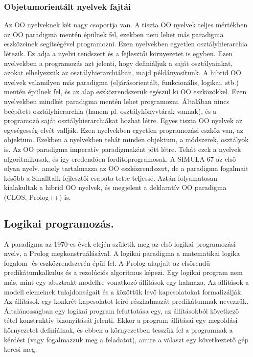 \subsubsection{Objetumorientált nyelvek fajtái}
Az OO nyelveknek két nagy csoportja van.
A tiszta OO nyelvek teljes mértékben az OO paradigma mentén épülnek fel, ezekben nem lehet más paradigma eszközeinek segítségével programozni. Ezen nyelvekben egyetlen osztályhierarchia létezik. Ez adja a nyelvi rendszert és a fejlesztői környezetet is egyben. Ezen nyelvekben a programozás azt jelenti, hogy definiáljuk a saját osztályainkat, azokat elhelyezzük az osztályhierarchiában, majd példányosítunk. A hibrid OO nyelvek valamilyen más paradigma (eljárásorientált, funkcionális, logikai, stb.) mentén épülnek fel, és az alap eszközrendszerük egészül ki OO eszközökkel. Ezen nyelvekben mindkét paradigma mentén lehet programozni. Általában nincs beépített osztályhierarchia (hanem pl. osztálykönyvtárak vannak), és a programozó saját osztályhierarchiákat hozhat létre. Egyes tiszta OO nyelvek az egységesség elvét vallják. Ezen nyelvekben egyetlen programozási eszköz van, az objektum. Ezekben a nyelvekben tehát minden objektum, a módszerek, osztályok is. Az OO paradigma imperatív paradigmaként jött létre. Tehát ezek a nyelvek algoritmikusak, és így eredendően fordítóprogramosak. A SIMULA 67 az első olyan nyelv, amely tartalmazza az OO eszközrendszert, de a paradigma fogalmait később a Smalltalk fejlesztői csapata tette teljessé. Aztán folyamatosan kialakultak a hibrid OO nyelvek, és megjelent a deklaratív OO paradigma (CLOS, Prolog++) is. 

\subsection{Logikai programozás.}

A paradigma az 1970-es évek elején születik meg az első logikai programozási nyelv, a Prolog megkonstruálásával. A logikai paradigma a matematikai logika fogalom- és eszközrendszerén épül fel. A Prolog alapjait az elsőrendű predikátumkalkulus és a rezolúciós algoritmus képezi. Egy logikai program nem más, mint egy absztrakt modellre vonatkozó állítások egy halmaza. Az állítások a modell elemeinek tulajdonságait és a közöttük levő kapcsolatokat formalizálják. Az állítások egy konkrét kapcsolatot leíró részhalmazát predikátumnak nevezzük. Általánosságban egy logikai program lefuttatása egy, az állításokból következő tétel konstruktív bizonyítását jelenti. Ekkor a program állításai egy megoldási környezetet definiálnak, és ebben a környezetben tesszük fel a programnak a kérdést (vagy fogalmazzuk meg a feladatot), amire a választ egy következtető gép keresi meg. 

